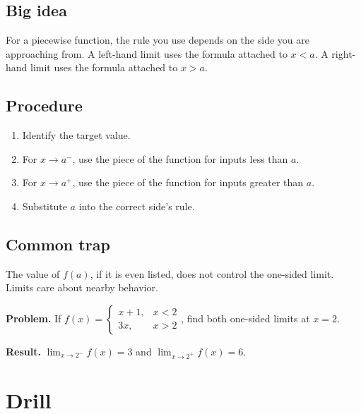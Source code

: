 \documentclass[11pt,oneside]{book}
\newenvironment{examplebox}[1]{\par\medskip\noindent{\color{steel}\bfseries #1}\par\noindent{\color{steel}\hrule}\smallskip}{\par\smallskip\noindent{\color{steel}\hrule}\par\medskip}
\begin{document}
\subsection*{Big idea}
For a piecewise function, the rule you use depends on the side you are approaching from. A left-hand limit uses the formula attached to $x<a$. A right-hand limit uses the formula attached to $x>a$.

\subsection*{Procedure}
\begin{enumerate}[leftmargin=*]
\item Identify the target value.
\item For $x\to a^-$, use the piece of the function for inputs less than $a$.
\item For $x\to a^+$, use the piece of the function for inputs greater than $a$.
\item Substitute $a$ into the correct side's rule.
\end{enumerate}

\subsection*{Common trap}
The value of $f(a)$, if it is even listed, does not control the one-sided limit. Limits care about nearby behavior.
\begin{examplebox}{Worked example}
\textbf{Problem.} If $f(x)=\begin{cases}x+1,&x<2\\3x,&x>2\end{cases}$, find both one-sided limits at $x=2$.

\textbf{Result.} $\lim_{x\to2^-}f(x)=3$ and $\lim_{x\to2^+}f(x)=6$.
\end{examplebox}
\section*{Drill}
\end{document}
